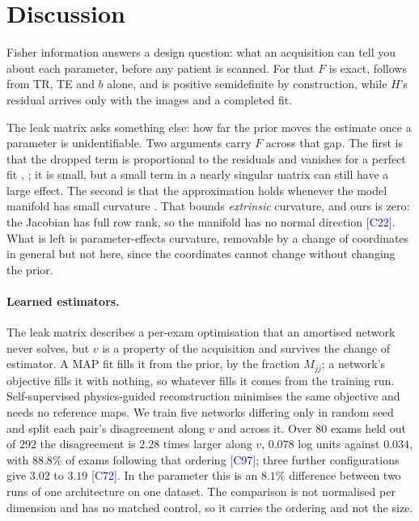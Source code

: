 \documentclass{article}
\newcommand{\claim}[1]{\textcolor{blue}{\footnotesize[#1]}}
\newcommand{\claim}[1]{\unskip}
\begin{document}
\section{Discussion}

Fisher information answers a design question: what an acquisition can tell you about each
parameter, before any patient is scanned. For that $F$ is exact, follows from TR, TE and $b$ alone,
and is positive semidefinite by construction, while $H$'s residual arrives only with the images
and a completed fit.

The leak matrix asks something else: how far the prior moves the estimate once a parameter
is unidentifiable. Two arguments carry $F$ across that gap. The first is that the dropped term is
proportional to the residuals and vanishes for a perfect fit \cite[Prop.~2]{kunstner2019},
\cite{transtrum2011}; it is small, but a small term in a nearly singular matrix can still have a
large effect. The second is that the approximation holds
whenever the model manifold has small curvature \cite{transtrum2012}. That bounds \emph{extrinsic} curvature, and ours is zero:
the Jacobian has full row rank, so the manifold has no normal direction \claim{C22}. What is
left is parameter-effects curvature, removable by a change of coordinates in general but not
here, since the coordinates cannot change without changing the prior.

\paragraph{Learned estimators.} The leak matrix describes a per-exam optimisation that an
amortised network never solves, but $v$ is a property of the acquisition and survives the change
of estimator. A MAP fit fills it from the prior, by the fraction $M_{jj}$; a network's objective
fills it with nothing, so whatever fills it comes from the training run. Self-supervised physics-guided reconstruction
\cite{vanlune2026} minimises the same objective and needs no reference maps. We train five
networks differing only in random seed and split each pair's disagreement along $v$ and across
it. Over $80$ exams held out of $292$ the disagreement is $2.28$ times larger along $v$, $0.078$ log units
against $0.034$, with $88.8\%$ of exams following that ordering \claim{C97}; three further
configurations give $3.02$ to $3.19$
\claim{C72}. In the parameter this is an $8.1\%$ difference between two runs of one
architecture on one dataset. The comparison is not normalised per dimension and has no matched
control, so it carries the ordering and not the size.
\end{document}
